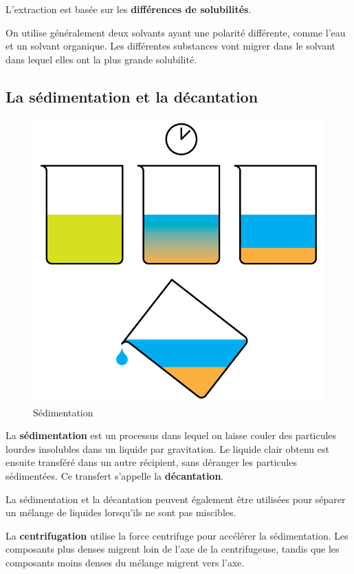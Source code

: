 \documentclass[
  11pt,
  a4paper,
  openany]{book}
\begin{document}
L'extraction est basée sur les \textbf{différences de solubilités}.

On utilise généralement deux solvants ayant une polarité différente, comme l'eau et un solvant organique. Les différentes substances vont migrer dans le solvant dans lequel elles ont la plus grande solubilité.

\newpage

\hypertarget{la-suxe9dimentation-et-la-duxe9cantation}{%
\subsection{La sédimentation et la décantation}\label{la-suxe9dimentation-et-la-duxe9cantation}}

\begin{figure}

{\centering \includegraphics[width=0.33\linewidth]{images/sedimentation} 

}

\caption{Sédimentation}\label{fig:sedimentation}
\end{figure}

La \textbf{sédimentation} est un processus dans lequel on laisse couler des particules lourdes insolubles dans un liquide par gravitation. Le liquide clair obtenu est ensuite transféré dans un autre récipient, sans déranger les particules sédimentées. Ce transfert s'appelle la \textbf{décantation}.

La sédimentation et la décantation peuvent également être utilisées pour séparer un mélange de liquides lorsqu'ils ne sont pas miscibles.

La \textbf{centrifugation} utilise la force centrifuge pour accélérer la sédimentation. Les composants plus denses migrent loin de l'axe de la centrifugeuse, tandis que les composants moins denses du mélange migrent vers l'axe.

\newpage
\end{document}
